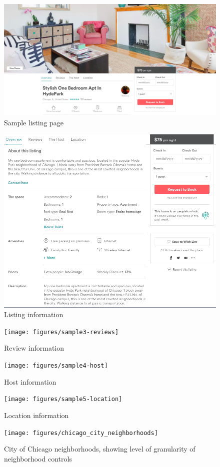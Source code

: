 \begin{figure}[!ht]\centering
	\includegraphics[width=.8\textwidth]{figures/sample1-cover}
	\caption{Sample listing page}
	\label{fig:listing}
\end{figure}

\begin{figure}[!ht]\centering
	\includegraphics[width=.8\textwidth]{figures/sample2-property}
	\caption{Listing information}
	\label{fig:property}
\end{figure}

\begin{figure}[!ht]\centering
\texttt{[image: figures/sample3-reviews]}
\caption{Review information}
	\label{fig:reviewinfo}
\end{figure}

\begin{figure}\centering
\texttt{[image: figures/sample4-host]}
\caption{Host information}
	\label{fig:host}
\end{figure}

\begin{figure}\centering
\texttt{[image: figures/sample5-location]}
\caption{Location information}
	\label{fig:location}
\end{figure}

\begin{figure}\centering
\texttt{[image: figures/chicago\_city\_neighborhoods]}
\caption[City of Chicago neighborhoods]{City of Chicago neighborhoods, showing level of granularity of neighborhood controls}
	\label{fig:chicago}
\end{figure}


